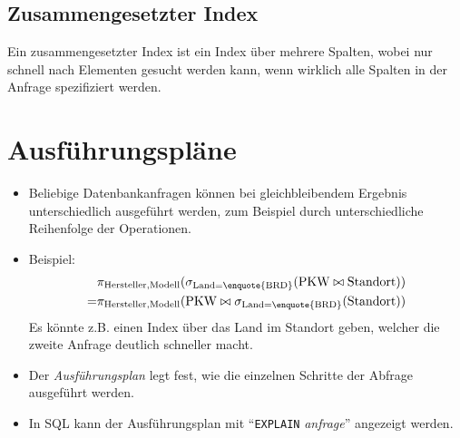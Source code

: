         \subsection{Zusammengesetzter Index} %
            Ein zusammengesetzter Index ist ein Index über mehrere Spalten, wobei nur schnell nach Elementen gesucht werden kann, wenn wirklich alle Spalten in der Anfrage spezifiziert werden.

    \section{Ausführungspläne} %
        \begin{itemize}
        	\item Beliebige Datenbankanfragen können bei gleichbleibendem Ergebnis unterschiedlich ausgeführt werden, zum Beispiel durch unterschiedliche Reihenfolge der Operationen.
        	\item Beispiel:
        		\begin{align*}
            		  & \pi _ { \text{Hersteller}, \text{Modell} } (\sigma _ { \text{Land} = \text{\enquote{BRD}} } (\text{PKW} \bowtie \text{Standort})) \\
            		= & \pi _ { \text{Hersteller}, \text{Modell} } (\text{PKW} \bowtie \sigma _ { \text{Land} = \text{\enquote{BRD}} } (\text{Standort}))
        		\end{align*}
        		Es könnte z.B. einen Index über das Land im Standort geben, welcher die zweite Anfrage deutlich schneller macht.
        	\item Der \textit{Ausführungsplan} legt fest, wie die einzelnen Schritte der Abfrage ausgeführt werden.
        	\item In SQL kann der Ausführungsplan mit \enquote{\lstinline|EXPLAIN| \textit{anfrage}} angezeigt werden.
        \end{itemize}

